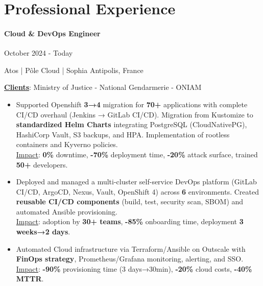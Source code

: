 \documentclass{article}
\begin{document}
\vspace{4ex}
\hrulefill
\section*{Professional Experience}

\paragraph{Cloud \& DevOps Engineer}\hspace*{\fill}October 2024 - Today

\noindent
Atos | Pôle Cloud | Sophia Antipolis, France

\noindent
\textbf{\underline{Clients}}: Ministry of Justice - National Gendarmerie - ONIAM

\raggedright  
\begin{itemize}
    \item{Supported Openshift \textbf{3→4} migration for \textbf{70+} applications with complete CI/CD overhaul (Jenkins → GitLab CI/CD). Migration from Kustomize to \textbf{standardized Helm Charts} integrating PostgreSQL (CloudNativePG), HashiCorp Vault, S3 backups, and HPA. Implementation of rootless containers and Kyverno policies.\\ \underline{Impact}: \textbf{0\%} downtime, \textbf{-70\%} deployment time, \textbf{-20\%} attack surface, trained \textbf{50+} developers.}
    \item{Deployed and managed a multi-cluster self-service DevOps platform (GitLab CI/CD, ArgoCD, Nexus, Vault, OpenShift 4) across \textbf{6} environments. Created \textbf{reusable CI/CD components} (build, test, security scan, SBOM) and automated Ansible provisioning.\\ \underline{Impact}: adoption by \textbf{30+ teams}, \textbf{-85\%} onboarding time, deployment \textbf{3 weeks→2 days}.}
    \item{Automated Cloud infrastructure via Terraform/Ansible on Outscale with \textbf{FinOps strategy}, Prometheus/Grafana monitoring, alerting, and SSO.\\ \underline{Impact}: \textbf{-90\%} provisioning time (3 days→30min), \textbf{-20\%} cloud costs, \textbf{-40\% MTTR}.}
\end{itemize}
\end{document}
